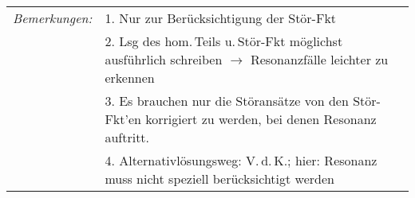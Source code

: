 \documentclass[a4paper,10pt,titlepage]{scrartcl}
\begin{document}
\medskip\\
\begin{tabular}{ll}
 \emph{Bemerkungen:}
 & 1. Nur zur Berücksichtigung der Stör-Fkt\\
 & 2. Lsg des hom.\,Teils u.\,Stör-Fkt möglichst ausführlich schreiben $\to$ Resonanzfälle leichter zu erkennen\\
 & 3. Es brauchen nur die Störansätze von den Stör-Fkt'en korrigiert zu werden, bei denen Resonanz auftritt.\\
 & 4. Alternativlösungsweg: V.\,d.\,K.; hier: Resonanz muss nicht speziell berücksichtigt werden\\
\end{tabular}
\end{document}
